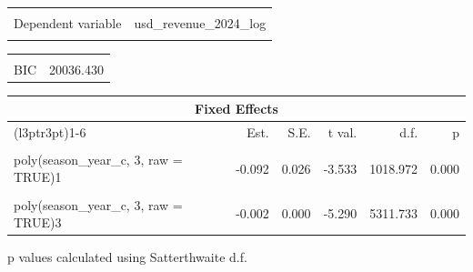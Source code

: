 \documentclass[
  12pt]{article}
\begin{document}
\begin{table}[!h]
\centering
\begin{tabular}{lr}
\toprule
\cellcolor{gray!10}{Observations} & \cellcolor{gray!10}{7023}\\
Dependent variable & usd\_revenue\_2024\_log\\
\cellcolor{gray!10}{Type} & \cellcolor{gray!10}{Mixed effects linear regression}\\
\bottomrule
\end{tabular}
\end{table} \begin{table}[!h]
\centering
\begin{tabular}{lr}
\toprule
\cellcolor{gray!10}{AIC} & \cellcolor{gray!10}{19974.718}\\
BIC & 20036.430\\
\bottomrule
\end{tabular}
\end{table} \begin{table}[!h]
\centering
\begin{threeparttable}
\begin{tabular}{lrrrrr}
\toprule
\multicolumn{6}{c}{Fixed Effects} \\
\cmidrule(l{3pt}r{3pt}){1-6}
  & Est. & S.E. & t val. & d.f. & p\\
\midrule
\cellcolor{gray!10}{(Intercept)} & \cellcolor{gray!10}{15.982} & \cellcolor{gray!10}{0.089} & \cellcolor{gray!10}{180.211} & \cellcolor{gray!10}{28.024} & \cellcolor{gray!10}{0.000}\\
poly(season\_year\_c, 3, raw = TRUE)1 & -0.092 & 0.026 & -3.533 & 1018.972 & 0.000\\
\cellcolor{gray!10}{poly(season\_year\_c, 3, raw = TRUE)2} & \cellcolor{gray!10}{0.023} & \cellcolor{gray!10}{0.005} & \cellcolor{gray!10}{4.304} & \cellcolor{gray!10}{5311.323} & \cellcolor{gray!10}{0.000}\\
poly(season\_year\_c, 3, raw = TRUE)3 & -0.002 & 0.000 & -5.290 & 5311.733 & 0.000\\
\bottomrule
\end{tabular}
\begin{tablenotes}
\item  p values calculated using Satterthwaite d.f. 
\end{tablenotes}
\end{threeparttable}
\end{table} \begin{table}[!h]
\centering
\begin{tabular}{lll}

\end{tabular}
\end{table}
\end{document}

